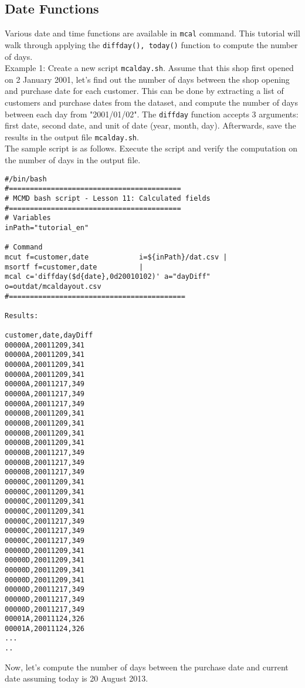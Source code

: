 \subsection{Date Functions }
Various date and time functions are available in \verb|mcal| command. This tutorial will walk through applying the \verb|diffday(), today()| function to compute the number of days. \\

Example 1: Create a new script \verb|mcalday.sh|. Assume that this shop first opened on 2 January 2001, let's find out the number of days between the shop opening and purchase date for each customer. This can be done by extracting a list of customers and purchase dates from the dataset, and compute the number of days between each day from "2001/01/02". The \verb|diffday| function accepts 3 arguments: first date, second date, and unit of date (year, month, day). Afterwards, save the results in the output file \verb|mcalday.sh|. \\

The sample script is as follows. Execute the script and verify the computation on the number of days in the output file.

\begin{verbatim}
#/bin/bash
#=========================================
# MCMD bash script - Lesson 11: Calculated fields
#=========================================
# Variables
inPath="tutorial_en"

# Command 
mcut f=customer,date            i=${inPath}/dat.csv |
msortf f=customer,date          |
mcal c='diffday($d{date},0d20010102)' a="dayDiff" o=outdat/mcaldayout.csv
#==========================================

Results: 

customer,date,dayDiff
00000A,20011209,341
00000A,20011209,341
00000A,20011209,341
00000A,20011209,341
00000A,20011217,349
00000A,20011217,349
00000A,20011217,349
00000B,20011209,341
00000B,20011209,341
00000B,20011209,341
00000B,20011209,341
00000B,20011217,349
00000B,20011217,349
00000B,20011217,349
00000C,20011209,341
00000C,20011209,341
00000C,20011209,341
00000C,20011209,341
00000C,20011217,349
00000C,20011217,349
00000C,20011217,349
00000D,20011209,341
00000D,20011209,341
00000D,20011209,341
00000D,20011209,341
00000D,20011217,349
00000D,20011217,349
00000D,20011217,349
00001A,20011124,326
00001A,20011124,326
...
..
\end{verbatim}

Now, let's compute the number of days between the purchase date and current date assuming today is 20 August 2013. 

